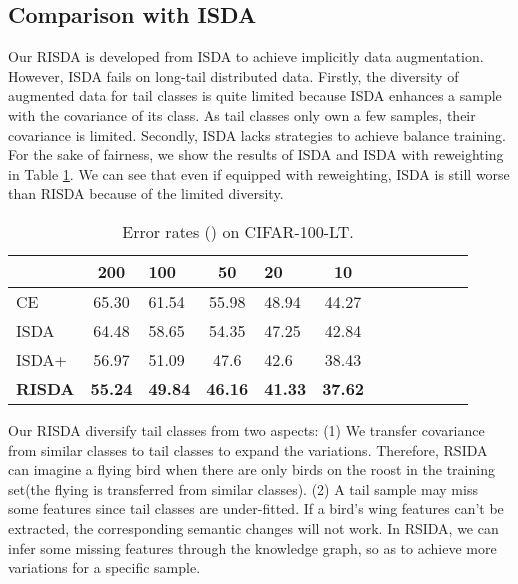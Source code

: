 \documentclass[letterpaper]{article} \usepackage{aaai22}  \usepackage{times}  \usepackage{helvet}  \usepackage{courier}  \usepackage[hyphens]{url}  \usepackage{graphicx} \usepackage{bm}
\begin{document}
\subsection{Comparison with ISDA}
Our RISDA is developed from ISDA to achieve implicitly data augmentation. However, ISDA fails on long-tail distributed data. Firstly, the diversity of augmented data for tail classes is quite limited because ISDA enhances a sample with the covariance of its class. As tail classes only own a few samples, their covariance is limited. Secondly, ISDA lacks strategies to achieve balance training. For the sake of fairness, we show the results of ISDA and ISDA with reweighting in Table \ref{cifar100}. We can see that even if equipped with reweighting, ISDA is still worse than RISDA because of the limited diversity.
\begin{table}[!ht]
\centering
	\begin{tabular}{lclclclclclc}
		\toprule
		      & 200   & 100   & 50    & 20    & 10 \\
		\midrule
		CE      & 65.30 & 61.54 & 55.98 & 48.94 & 44.27 \\ 
		ISDA  & 64.48      &58.65       &54.35      &47.25       &42.84      \\
		ISDA+     & 56.97 & 51.09 & 47.6  & 42.6  & 38.43  \\
		\textbf{RISDA}                                 &\textbf{55.24}       &\textbf{49.84}       &\textbf{46.16}       &\textbf{41.33}         &\textbf{37.62}       \\
		\bottomrule
	\end{tabular}
	\caption{Error rates () on CIFAR-100-LT.}
	\label{cifar100}
\end{table}

Our RISDA diversify tail classes from two aspects: (1) We transfer covariance from similar classes to tail classes to expand the variations. Therefore, RSIDA can imagine a flying bird when there are only birds on the roost in the training set(the flying is transferred from similar classes). (2) A tail sample may miss some features since tail classes are under-fitted. If a bird's wing features can't be extracted, the corresponding semantic changes will not work. In RSIDA, we can infer some missing features through the knowledge graph, so as to achieve more variations for a specific sample.
\end{document}
